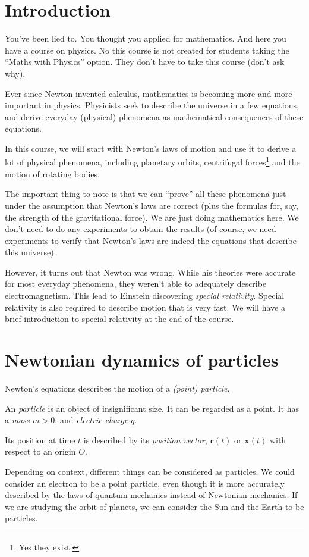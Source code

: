 \documentclass[a4paper]{article}
\begin{document}
\tableofcontents
\setcounter{section}{-1}
\section{Introduction}
You've been lied to. You thought you applied for mathematics. And here you have a course on physics. No this course is not created for students taking the ``Maths with Physics'' option. They don't have to take this course (don't ask why).

Ever since Newton invented calculus, mathematics is becoming more and more important in physics. Physicists seek to describe the universe in a few equations, and derive everyday (physical) phenomena as mathematical consequences of these equations.

In this course, we will start with Newton's laws of motion and use it to derive a lot of physical phenomena, including planetary orbits, centrifugal forces\footnote{Yes they exist.} and the motion of rotating bodies.

The important thing to note is that we can ``prove'' all these phenomena just under the assumption that Newton's laws are correct (plus the formulas for, say, the strength of the gravitational force). We are just doing mathematics here. We don't need to do any experiments to obtain the results (of course, we need experiments to verify that Newton's laws are indeed the equations that describe this universe).

However, it turns out that Newton was wrong. While his theories were accurate for most everyday phenomena, they weren't able to adequately describe electromagnetism. This lead to Einstein discovering \emph{special relativity}. Special relativity is also required to describe motion that is very fast. We will have a brief introduction to special relativity at the end of the course.

\section{Newtonian dynamics of particles}
Newton's equations describes the motion of a \emph{(point) particle}.
\begin{defi}[Particle]
  An \emph{particle} is an object of insignificant size. It can be regarded as a point. It has a \emph{mass} $m > 0$, and \emph{electric charge} $q$.

  Its position at time $t$ is described by its \emph{position vector}, $\mathbf{r}(t)$ or $\mathbf{x}(t)$ with respect to an origin $O$.
\end{defi}
Depending on context, different things can be considered as particles. We could consider an electron to be a point particle, even though it is more accurately described by the laws of quantum mechanics instead of Newtonian mechanics. If we are studying the orbit of planets, we can consider the Sun and the Earth to be particles.
\end{document}
